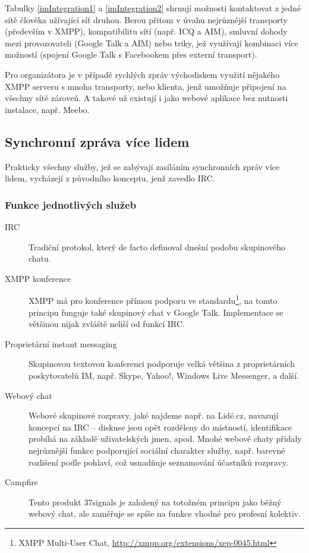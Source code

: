 \documentclass[12pt,oneside,final]{fithesis2}
\begin{document}
Tabulky \ref{imIntegration1} a \ref{imIntegration2} shrnují možnosti kontaktovat z jedné sítě člověka užívající síť druhou. Berou přitom v úvahu nejrůznější transporty (především v XMPP), kompatibilitu sítí (např. ICQ a AIM), smluvní dohody mezi provozovateli (Google Talk a AIM) nebo triky, jež využívají kombinaci více možností (spojení Google Talk s Facebookem přes externí transport).

Pro organizátora je v případě rychlých zpráv východiskem využití nějakého XMPP serveru s mnoha transporty, nebo klienta, jenž umožňuje připojení na všechny sítě zároveň. A takové už existují i jako webové aplikace bez nutnosti instalace, např. Meebo.

\subsection{Synchronní zpráva více lidem}
Prakticky všechny služby, jež se zabývají zasíláním synchronních zpráv více lidem, vycházejí z původního konceptu, jenž zavedlo IRC.

\subsubsection*{Funkce jednotlivých služeb}
\begin{description}
    \item[IRC]
        Tradiční protokol, který de facto definoval dnešní podobu skupinového chatu.

    \item[XMPP konference]
        XMPP má pro konference přímou podporu ve standardu\footnote{XMPP Multi-User Chat, \url{http://xmpp.org/extensions/xep-0045.html}}, na tomto principu funguje také skupinový chat v Google Talk. Implementace se většinou nijak zvláště neliší od funkcí IRC.

    \item[Proprietární instant messaging]
        Skupinovou textovou konferenci podporuje velká většina z proprietárních poskytovatelů IM, např. Skype, Yahoo!, Windows Live Messenger, a další.

    \item[Webový chat]
        Webové skupinové rozpravy, jaké najdeme např. na Lidé.cz, navazují koncepcí na IRC -- diskuse jsou opět rozděleny do místností, identifikace probíhá na základě uživatelských jmen, apod. Mnohé webové chaty přidaly nejrůznější funkce podporující sociální charakter služby, např. barevné rozlišení podle pohlaví, což usnadňuje seznamování účastníků rozpravy.

    \item[Campfire]
        Tento produkt 37signals je založený na totožném principu jako běžný webový chat, ale zaměřuje se spíše na funkce vhodné pro profesní kolektiv.
\end{description}
\end{document}
